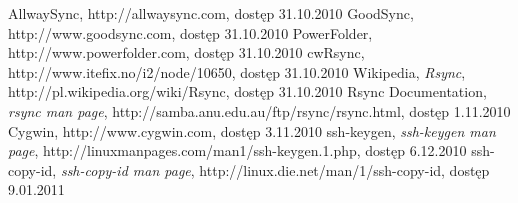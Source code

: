 \begin{thebibliography}{5}
   AllwaySync, http://allwaysync.com, dostęp 31.10.2010
   GoodSync, http://www.goodsync.com, dostęp 31.10.2010
   PowerFolder, http://www.powerfolder.com, dostęp 31.10.2010
   cwRsync, http://www.itefix.no/i2/node/10650, dostęp 31.10.2010
   Wikipedia, \textit{Rsync}, http://pl.wikipedia.org/wiki/Rsync, dostęp 31.10.2010
   Rsync Documentation, \textit{rsync man page}, http://samba.anu.edu.au/ftp/rsync/rsync.html, dostęp 1.11.2010
   Cygwin, http://www.cygwin.com, dostęp 3.11.2010
   ssh-keygen, \textit{ssh-keygen man page}, http://linuxmanpages.com/man1/ssh-keygen.1.php, dostęp 6.12.2010
   ssh-copy-id, \textit{ssh-copy-id man page}, http://linux.die.net/man/1/ssh-copy-id, dostęp 9.01.2011

\end{thebibliography} 

